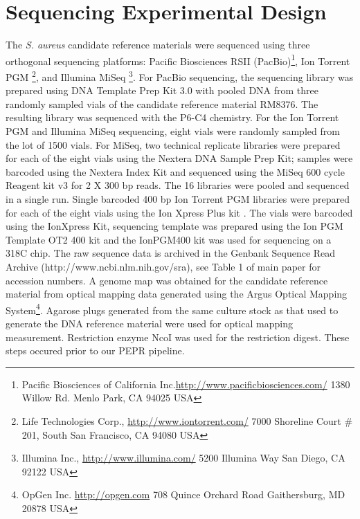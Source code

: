 \documentclass{article}\usepackage[]{graphicx}\usepackage[]{color}
\begin{document}
\section{Sequencing Experimental Design}
The \emph{S. aureus} candidate reference materials were sequenced using three orthogonal sequencing platforms: Pacific Biosciences RSII (PacBio)\footnote{\label{pacbio}Pacific Biosciences of California Inc.\url{http://www.pacificbiosciences.com/} 1380 Willow Rd. Menlo Park, CA 94025 USA}, Ion Torrent PGM \footnote{\label{pgm}Life Technologies Corp., \url{http://www.iontorrent.com/} 7000 Shoreline Court \# 201, South San Francisco, CA 94080 USA}, and Illumina MiSeq \footnote{\label{illumina}Illumina Inc., \url{http://www.illumina.com/} 5200 Illumina Way San Diego, CA 92122 USA}. For PacBio sequencing, the sequencing library was prepared using DNA Template Prep Kit 3.0 with pooled DNA from three randomly sampled vials of the candidate reference material RM8376. The resulting library was sequenced with the P6-C4 chemistry.  
For the Ion Torrent PGM  and Illumina MiSeq  sequencing, eight vials were randomly sampled from the lot of 1500 vials. For MiSeq, two technical replicate libraries were prepared for each of the eight vials using the Nextera DNA Sample Prep Kit; samples were barcoded using the Nextera Index Kit and sequenced using the MiSeq 600 cycle Reagent kit v3 for 2 X 300 bp reads.  The 16 libraries were pooled and sequenced in a single run.  Single barcoded 400 bp Ion Torrent PGM libraries were prepared for each of the eight vials using the Ion Xpress Plus kit .  The vials were barcoded using the IonXpress Kit, sequencing template was prepared using the Ion PGM Template OT2 400 kit and the IonPGM400 kit was used for sequencing on a 318C chip. The raw sequence data is archived in the Genbank Sequence Read Archive (http://www.ncbi.nlm.nih.gov/sra), see Table 1 of main paper for accession numbers.  A genome map was obtained for the candidate reference material from optical mapping data generated using the Argus Optical Mapping System\footnote{\label{opgen}OpGen Inc. \url{http://opgen.com} 708 Quince Orchard Road Gaithersburg, MD 20878 USA}. Agarose plugs generated from the same culture stock as that used to generate the DNA reference material were used for optical mapping measurement.  Restriction enzyme NcoI was used for the restriction digest. These steps occured prior to our PEPR pipeline.
\end{document}
